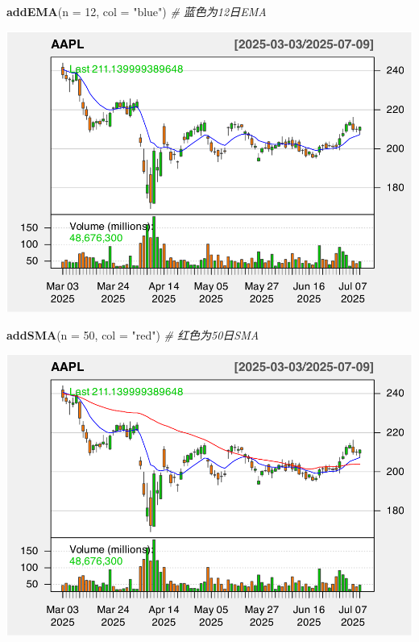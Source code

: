 \documentclass[]{ctexbook}
\newenvironment{Shaded}{\begin{snugshade}}{\end{snugshade}}
\newcommand{\AttributeTok}[1]{\textcolor[rgb]{0.13,0.29,0.53}{#1}}
\newcommand{\CommentTok}[1]{\textcolor[rgb]{0.56,0.35,0.01}{\textit{#1}}}
\newcommand{\DecValTok}[1]{\textcolor[rgb]{0.00,0.00,0.81}{#1}}
\newcommand{\FunctionTok}[1]{\textcolor[rgb]{0.13,0.29,0.53}{\textbf{#1}}}
\newcommand{\NormalTok}[1]{#1}
\newcommand{\StringTok}[1]{\textcolor[rgb]{0.31,0.60,0.02}{#1}}
\begin{document}
\begin{Shaded}
\begin{Highlighting}[]
\FunctionTok{addEMA}\NormalTok{(}\AttributeTok{n =} \DecValTok{12}\NormalTok{, }\AttributeTok{col =} \StringTok{"blue"}\NormalTok{)    }\CommentTok{\# 蓝色为12日EMA}
\end{Highlighting}
\end{Shaded}

\includegraphics[width=0.9\linewidth]{quantmod_files/figure-latex/ema_2-2}

\begin{Shaded}
\begin{Highlighting}[]
\FunctionTok{addSMA}\NormalTok{(}\AttributeTok{n =} \DecValTok{50}\NormalTok{, }\AttributeTok{col =} \StringTok{"red"}\NormalTok{)     }\CommentTok{\# 红色为50日SMA}
\end{Highlighting}
\end{Shaded}

\includegraphics[width=0.9\linewidth]{quantmod_files/figure-latex/ema_2-3}
\end{document}
